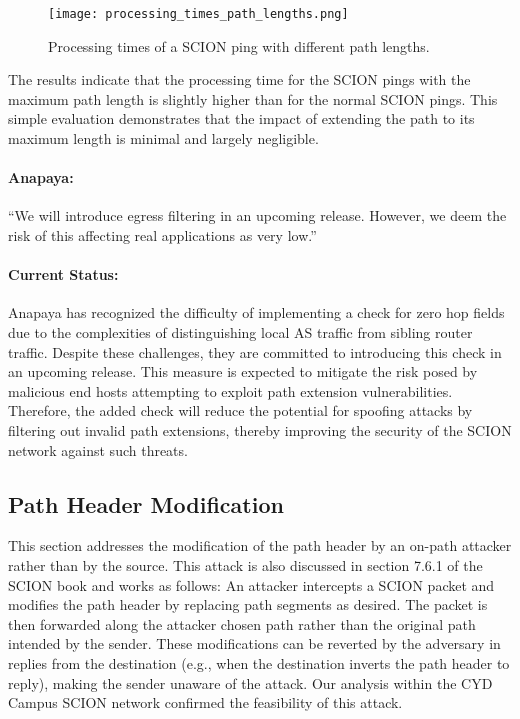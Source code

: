 \begin{figure}[H]
    \centering
    \texttt{[image: processing\_times\_path\_lengths.png]}
    \caption{Processing times of a SCION ping with different path lengths.}
    \label{fig:path_extension}
\end{figure}

The results indicate that the processing time for the SCION pings with the maximum path length is slightly higher than for the normal SCION pings.
This simple evaluation demonstrates that the impact of extending the path to its maximum length is minimal and largely negligible.


\begin{boxH}
    \paragraph{Anapaya:}
    ``We will introduce egress filtering in an upcoming release.
    However, we deem the risk of this affecting real applications as very low.''
\end{boxH}

\paragraph{Current Status:}
Anapaya has recognized the difficulty of implementing a check for zero hop fields due to the complexities of distinguishing local AS traffic from sibling router traffic.
Despite these challenges, they are committed to introducing this check in an upcoming release.
This measure is expected to mitigate the risk posed by malicious end hosts attempting to exploit path extension vulnerabilities.
Therefore, the added check will reduce the potential for spoofing attacks by filtering out invalid path extensions, thereby improving the security of the SCION network against such threats.

\subsection{Path Header Modification}
\label{sec:path-header-modification}
This section addresses the modification of the path header by an on-path attacker rather than by the source.
This attack is also discussed in section 7.6.1 of the SCION book \cite{Perrig2022} and works as follows:
An attacker intercepts a SCION packet and modifies the path header by replacing path segments as desired.
The packet is then forwarded along the attacker chosen path rather than the original path intended by the sender.
These modifications can be reverted by the adversary in replies from the destination (e.g., when the destination inverts the path header to reply), making the sender unaware of the attack.
Our analysis within the CYD Campus SCION network confirmed the feasibility of this attack.

